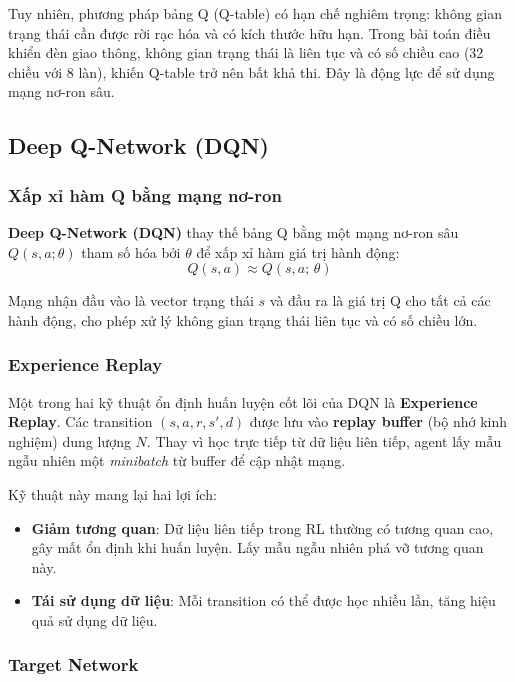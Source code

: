 Tuy nhiên, phương pháp bảng Q (Q-table) có hạn chế nghiêm trọng: không gian trạng thái cần được rời rạc hóa và có kích thước hữu hạn. Trong bài toán điều khiển đèn giao thông, không gian trạng thái là liên tục và có số chiều cao (32 chiều với 8 làn), khiến Q-table trở nên bất khả thi. Đây là động lực để sử dụng mạng nơ-ron sâu.

\subsection{Deep Q-Network (DQN)}

\subsubsection{Xấp xỉ hàm Q bằng mạng nơ-ron}

\textbf{Deep Q-Network (DQN)} thay thế bảng Q bằng một mạng nơ-ron sâu $Q(s, a; \theta)$ tham số hóa bởi $\theta$ để xấp xỉ hàm giá trị hành động:
\[
Q(s, a) \approx Q(s, a;\, \theta)
\]

Mạng nhận đầu vào là vector trạng thái $s$ và đầu ra là giá trị Q cho tất cả các hành động, cho phép xử lý không gian trạng thái liên tục và có số chiều lớn.

\subsubsection{Experience Replay}

Một trong hai kỹ thuật ổn định huấn luyện cốt lõi của DQN là \textbf{Experience Replay}. Các transition $(s, a, r, s', d)$ được lưu vào \textbf{replay buffer} (bộ nhớ kinh nghiệm) dung lượng $N$. Thay vì học trực tiếp từ dữ liệu liên tiếp, agent lấy mẫu ngẫu nhiên một \textit{minibatch} từ buffer để cập nhật mạng.

Kỹ thuật này mang lại hai lợi ích:
\begin{itemize}
    \item \textbf{Giảm tương quan}: Dữ liệu liên tiếp trong RL thường có tương quan cao, gây mất ổn định khi huấn luyện. Lấy mẫu ngẫu nhiên phá vỡ tương quan này.
    \item \textbf{Tái sử dụng dữ liệu}: Mỗi transition có thể được học nhiều lần, tăng hiệu quả sử dụng dữ liệu.
\end{itemize}

\subsubsection{Target Network}

